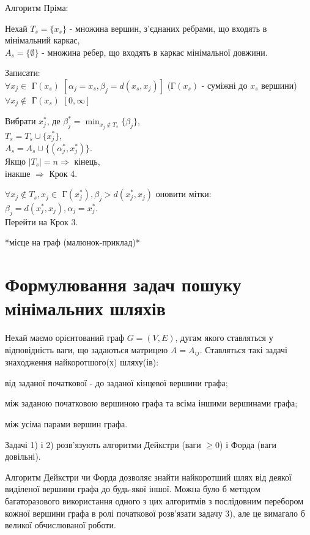 \documentclass[12pt,a4paper]{book}
\newenvironment{slim_enumerate}{
\begin{enumerate}
  \setlength{\itemsep}{1pt}
  \setlength{\parskip}{0pt}
  \setlength{\parsep}{0pt}}
{\end{enumerate}}
\begin{document}
Алгоритм Пріма:
\begin{slim_enumerate}
  \item Нехай $T_s = \{x_s\}$ - множина вершин, з’єднаних ребрами, що входять в мінімальний каркас,\\
$A_s = \{\emptyset\}$ - множина ребер, що входять в каркас мінімальної довжини.
  \item Записати:\\
$\forall x_j\in$ Г$(x_s)$ $[\alpha_j=x_s, \beta_j=d(x_s,x_j)]$ (Г$(x_s)$ - суміжні до $x_s$ вершини)\\
$\forall x_j\notin$ Г$(x_s)$ $[0,\infty]$
  \item Вибрати $x_j^*$, де $\beta_j^*=\displaystyle\min_{x_j\notin T_s}\{\beta_j\}$,\\
$T_s=T_s\cup\{x_j^*\}$,\\
$A_s=A_s\cup\{(\alpha_j^*,x_j^*)\}$.\\
Якщо $|T_s|=n\Rightarrow$ кінець,\\
інакше ${\Rightarrow}$ Крок 4.
  \item $\forall x_j\notin T_s, x_j\in$ Г$(x_j^*), \beta_j>d(x_j^*,x_j)$ оновити мітки:\\
$\beta_j=d(x_j^*,x_j), \alpha_j=x_j^*$.\\
Перейти на Крок 3.
\end{slim_enumerate}

*місце на граф (малюнок-приклад)*

\section{Формулювання задач пошуку мінімальних шляхів}

Нехай маємо орієнтований граф $G=(V,E)$, дугам якого ставляться у відповідність ваги, що задаються матрицею $A=A_{ij}$. Ставляться такі задачі знаходження найкоротшого(х) шляху(ів):
\begin{slim_enumerate}
  \item від заданої початкової - до заданої кінцевої вершини графа;
  \item між заданою початковою вершиною графа та всіма іншими вершинами графа;
  \item між усіма парами вершин графа.
\end{slim_enumerate}
Задачі 1) і 2) розв’язують алгоритми Дейкстри (ваги $\ge 0$) і Форда (ваги довільні).

Алгоритм Дейкстри чи Форда дозволяє знайти найкоротший шлях від деякої виділеної вершини графа до будь-якої іншої. Можна було б методом багаторазового використання одного з цих алгоритмів з послідовним перебором кожної вершини графа в ролі початкової розв’язати задачу 3), але це вимагало б великої обчислюваної роботи.
\end{document}
